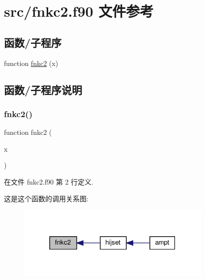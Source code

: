\hypertarget{fnkc2_8f90}{}\section{src/fnkc2.f90 文件参考}
\label{fnkc2_8f90}
\subsection*{函数/子程序}
\begin{DoxyCompactItemize}
\item 
function \mbox{\hyperlink{fnkc2_8f90_a53f9ea35cc61666213e0d490123a175a}{fnkc2}} (x)
\end{DoxyCompactItemize}


\subsection{函数/子程序说明}
\mbox{\label{fnkc2_8f90_a53f9ea35cc61666213e0d490123a175a}} 
\subsubsection{\texorpdfstring{fnkc2()}{fnkc2()}}
{\footnotesize\ttfamily function fnkc2 (\begin{DoxyParamCaption}\item[{}]{x }\end{DoxyParamCaption})}



在文件 fnkc2.\+f90 第 2 行定义.

这是这个函数的调用关系图\+:
\nopagebreak
\begin{figure}[H]
\begin{center}
\leavevmode
\includegraphics[width=271pt]{fnkc2_8f90_a53f9ea35cc61666213e0d490123a175a_icgraph}
\end{center}
\end{figure}
